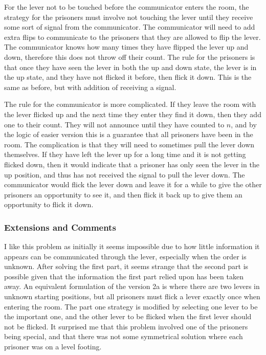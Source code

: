 For the lever not to be touched before the communicator enters the room, the strategy for the prisoners must involve not touching the lever until they receive some sort of signal from the communicator. The communicator will need to add extra flips to communicate to the prisoners that they are allowed to flip the lever. The communicator knows how many times they have flipped the lever up and down, therefore this does not throw off their count. The rule for the prisoners is that once they have seen the lever in both the up and down state, the lever is in the up state, and they have not flicked it before, then flick it down. This is the same as before, but with addition of receiving a signal.

The rule for the communicator is more complicated. If they leave the room with the lever flicked up and the next time they enter they find it down, then they add one to their count. They will not announce until they have counted to $n$, and by the logic of easier version this is a guarantee that all prisoners have been in the room. The complication is that they will need to sometimes pull the lever down themselves. If they have left the lever up for a long time and it is not getting flicked down, then it would indicate that a prisoner has only seen the lever in the up position, and thus has not received the signal to pull the lever down. The communicator would flick the lever down and leave it for a while to give the other prisoners an opportunity to see it, and then flick it back up to give them an opportunity to flick it down.

\subsubsection{Extensions and Comments}

I like this problem as initially it seems impossible due to how little information it appears can be communicated through the lever, especially when the order is unknown. After solving the first part, it seems strange that the second part is possible given that the information the first part relied upon has been taken away. An equivalent formulation of the version 2a is where there are two levers in unknown starting positions, but all prisoners must flick a lever exactly once when entering the room. The part one strategy is modified by selecting one lever to be the important one, and the other lever to be flicked when the first lever should not be flicked. It surprised me that this problem involved one of the prisoners being special, and that there was not some symmetrical solution where each prisoner was on a level footing.

